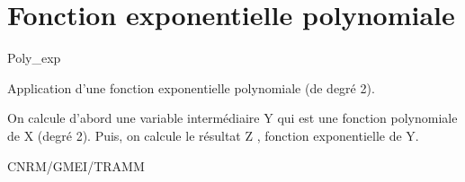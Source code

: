 %
\section{Fonction exponentielle polynomiale}

 \textsf{Poly\_exp}

Application d'une fonction exponentielle polynomiale (de degr\'e 2).

\bigskip





On calcule d'abord une variable interm\'ediaire Y qui est une fonction polynomiale de X (degr\'e 2).
Puis, on calcule le r\'esultat Z , fonction exponentielle de Y.

CNRM/GMEI/TRAMM


